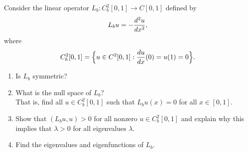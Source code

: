 Consider the linear operator $L_b:C_b^2[0,1] \to C[0,1]$ defined by
\[ L_b u = -{d^2 u \over dx^2},\]
where 
\[ C_b^2[0,1] = \Big\{ u\in C^2[0,1]: {du\over dx}(0) = u(1) = 0\Big\}.\]
\begin{enumerate}
\item Is $L_b$ symmetric?
\item What is the null space of $L_b$?\\
      That is, find all $u\in C_b^2[0,1]$ such that $L_b u (x) = 0$ for all $x\in[0,1]$.
\item Show that $(L_b u,u)> 0$ for all nonzero $u\in C^2_b[0,1]$
      and explain why this implies that $\lambda > 0$ for all eigenvalues $\lambda$.
\item Find the eigenvalues and eigenfunctions of $L_b$.
\end{enumerate}


